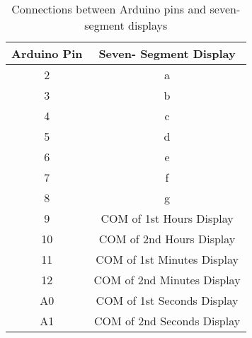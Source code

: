  \begin{table}[h!]
    \centering
    \begin{tabular}{|c|c|}
        \hline
        \textbf{Arduino Pin} & \textbf{Seven- Segment Display} \\
        \hline
        2  & a  \\
        3  & b  \\
        4  & c  \\
        5  & d  \\
        6  & e  \\
        7  & f  \\
        8  & g  \\
        9  & COM of 1st Hours Display \\
        10 & COM of 2nd Hours Display \\
        11 & COM of 1st Minutes Display \\
        12 & COM of 2nd Minutes Display \\
        A0 & COM of 1st Seconds Display \\
        A1 & COM of 2nd Seconds Display \\
        \hline
    \end{tabular}
    \caption{Connections between Arduino pins and seven-segment displays}
\end{table}
